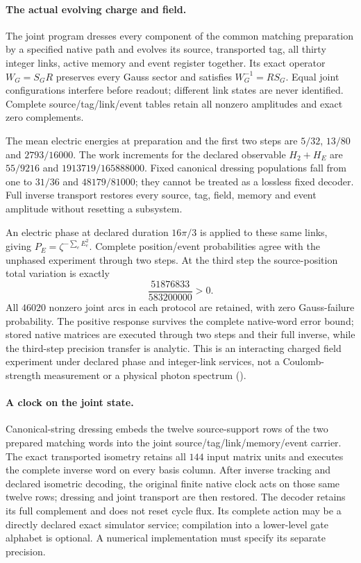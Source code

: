 \paragraph{The actual evolving charge and field.}
The joint program dresses every component of the common matching preparation
by a specified native path and evolves its source, transported tag, all
thirty integer links, active memory and event register together. Its exact
operator $W_G=S_GR$ preserves every Gauss sector and satisfies
$W_G^{-1}=RS_G$. Equal joint configurations interfere before readout;
different link states are never identified. Complete source/tag/link/event
tables retain all nonzero amplitudes and exact zero complements.

The mean electric energies at preparation and the first two steps are
$5/32$, $13/80$ and $2793/16000$. The work increments for the declared
observable $H_2+H_E$ are $55/9216$ and $1913719/165888000$. Fixed canonical
dressing populations fall from one to $31/36$ and $48179/81000$; they
cannot be treated as a lossless fixed decoder. Full inverse transport
restores every source, tag, field, memory and event amplitude without
resetting a subsystem.

An electric phase at declared duration $16\pi/3$ is applied to these same
links, giving $P_E=\zeta^{-\sum_e E_e^2}$. Complete position/event probabilities
agree with the unphased experiment through two steps. At the third step
the source-position total variation is exactly
\[
 \frac{51876833}{583200000}>0.
\]
All $46020$ nonzero joint arcs in each protocol are retained, with zero
Gauss-failure probability. The positive response survives the complete
native-word error bound; stored native matrices are executed through two
steps and their full inverse, while the third-step precision transfer is
analytic. This is an interacting charged field experiment under declared
phase and integer-link services, not a Coulomb-strength measurement or a
physical photon spectrum ().

\paragraph{A clock on the joint state.}
Canonical-string dressing embeds the twelve source-support rows of the two
prepared matching words into the joint source/tag/link/memory/event carrier.
The exact transported isometry retains all $144$ input matrix units and
executes the complete inverse word on every basis column. After inverse
tracking and declared isometric decoding, the original finite native clock
acts on those same twelve rows; dressing and joint transport are then
restored. The decoder retains its full complement and does not reset cycle
flux. Its complete action may be a directly declared exact simulator
service; compilation into a lower-level gate alphabet is optional.
A numerical implementation must specify its separate precision.

